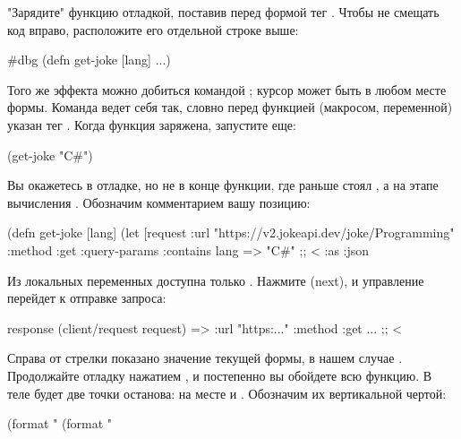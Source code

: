"Зарядите" функцию отладкой, поставив перед формой  тег . Чтобы не смещать код вправо, расположите его отдельной строке выше:

\begin{english}
  \begin{clojure}
#dbg
(defn get-joke [lang]
  ...)
  \end{clojure}
\end{english}

Того же эффекта можно добиться командой ; курсор может быть в любом месте формы. Команда ведет себя так, словно перед функцией (макросом, переменной) указан тег . Когда функция заряжена, запустите еще:

\begin{english}
  \begin{clojure}
(get-joke "C#")
  \end{clojure}
\end{english}

Вы окажетесь в отладке, но не в конце функции, где раньше стоял , а на этапе вычисления . Обозначим комментарием вашу позицию:

\begin{english}
  \begin{clojure}
(defn get-joke [lang]
  (let [request
        {:url "https://v2.jokeapi.dev/joke/Programming"
         :method :get
         :query-params {:contains lang} => "C#" ;; <
         :as :json}
  \end{clojure}
\end{english}

Из локальных переменных доступна только . Нажмите  (next), и управление перейдет к отправке запроса:

\begin{english}
  \begin{clojure}
response
(client/request request) => {:url "https:..." :method :get ...} ;; <
  \end{clojure}
\end{english}

Справа от стрелки показано значение текущей формы, в нашем случае . Продолжайте отладку нажатием , и постепенно вы обойдете всю функцию. В теле  будет две точки останова: на месте  и . Обозначим их вертикальной чертой:

\begin{english}
  \begin{clojure}
(format "%
(format "%
  \end{clojure}
\end{english}


